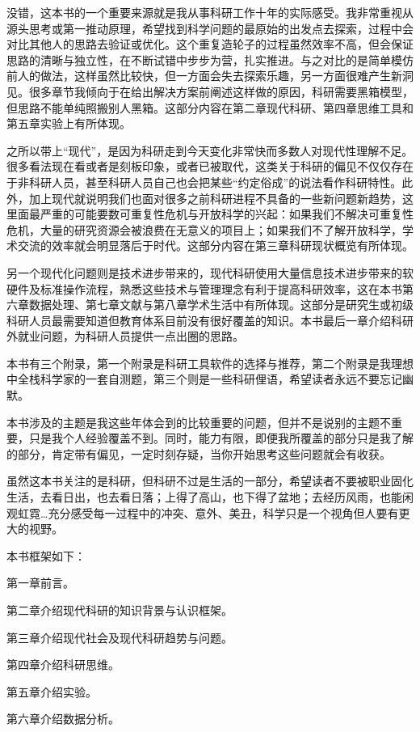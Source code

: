 \documentclass[]{tufte-book}
\begin{document}
没错，这本书的一个重要来源就是我从事科研工作十年的实际感受。我非常重视从源头思考或第一推动原理，希望找到科学问题的最原始的出发点去探索，过程中会对比其他人的思路去验证或优化。这个重复造轮子的过程虽然效率不高，但会保证思路的清晰与独立性，在不断试错中步步为营，扎实推进。与之对比的是简单模仿前人的做法，这样虽然比较快，但一方面会失去探索乐趣，另一方面很难产生新洞见。很多章节我倾向于在给出解决方案前阐述这样做的原因，科研需要黑箱模型，但思路不能单纯照搬别人黑箱。这部分内容在第二章现代科研、第四章思维工具和第五章实验上有所体现。

之所以带上``现代''，是因为科研走到今天变化非常快而多数人对现代性理解不足。很多看法现在看或者是刻板印象，或者已被取代，这类关于科研的偏见不仅仅存在于非科研人员，甚至科研人员自己也会把某些``约定俗成''的说法看作科研特性。此外，加上现代就说明我们也面对很多之前科研进程不具备的一些新问题新趋势，这里面最严重的可能要数可重复性危机与开放科学的兴起：如果我们不解决可重复性危机，大量的研究资源会被浪费在无意义的项目上；如果我们不了解开放科学，学术交流的效率就会明显落后于时代。这部分内容在第三章科研现状概览有所体现。

另一个现代化问题则是技术进步带来的，现代科研使用大量信息技术进步带来的软硬件及标准操作流程，熟悉这些技术与管理理念有利于提高科研效率，这在本书第六章数据处理、第七章文献与第八章学术生活中有所体现。这部分是研究生或初级科研人员最需要知道但教育体系目前没有很好覆盖的知识。本书最后一章介绍科研外就业问题，为科研人员提供一点出圈的思路。

本书有三个附录，第一个附录是科研工具软件的选择与推荐，第二个附录是我理想中全栈科学家的一套自测题，第三个则是一些科研俚语，希望读者永远不要忘记幽默。

本书涉及的主题是我这些年体会到的比较重要的问题，但并不是说别的主题不重要，只是我个人经验覆盖不到。同时，能力有限，即便我所覆盖的部分只是我了解的部分，肯定带有偏见，一定时刻存疑，当你开始思考这些问题就会有收获。

虽然这本书关注的是科研，但科研不过是生活的一部分，希望读者不要被职业固化生活，去看日出，也去看日落；上得了高山，也下得了盆地；去经历风雨，也能闲观虹霓\ldots 充分感受每一过程中的冲突、意外、美丑，科学只是一个视角但人要有更大的视野。

本书框架如下：

第一章前言。

第二章介绍现代科研的知识背景与认识框架。

第三章介绍现代社会及现代科研趋势与问题。

第四章介绍科研思维。

第五章介绍实验。

第六章介绍数据分析。
\end{document}
